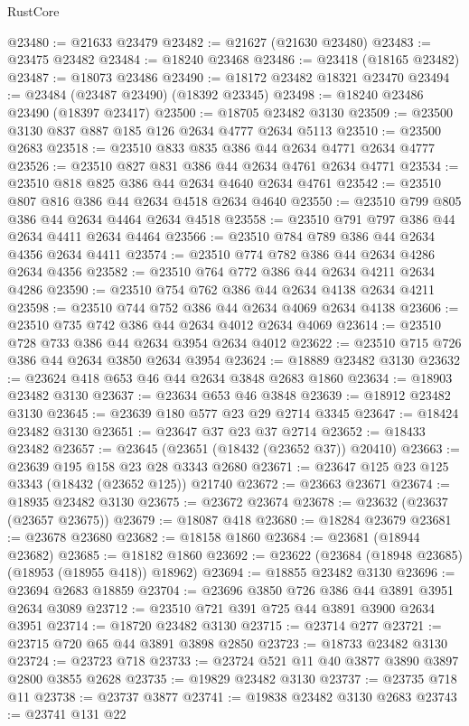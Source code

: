 \begin{lexlean}{RustCore}
\begin{coremodule}
@23480 := @21633 @23479
@23482 := @21627 (@21630 @23480)
@23483 := @23475 @23482
@23484 := @18240 @23468
@23486 := @23418 (@18165 @23482)
@23487 := @18073 @23486
@23490 := @18172 @23482 @18321 @23470
@23494 := @23484 (@23487 @23490) (@18392 @23345)
@23498 := @18240 @23486 @23490 (@18397 @23417)
@23500 := @18705 @23482 @3130
@23509 := @23500 @3130 @837 @887 @185 @126 @2634 @4777 @2634 @5113
@23510 := @23500 @2683
@23518 := @23510 @833 @835 @386 @44 @2634 @4771 @2634 @4777
@23526 := @23510 @827 @831 @386 @44 @2634 @4761 @2634 @4771
@23534 := @23510 @818 @825 @386 @44 @2634 @4640 @2634 @4761
@23542 := @23510 @807 @816 @386 @44 @2634 @4518 @2634 @4640
@23550 := @23510 @799 @805 @386 @44 @2634 @4464 @2634 @4518
@23558 := @23510 @791 @797 @386 @44 @2634 @4411 @2634 @4464
@23566 := @23510 @784 @789 @386 @44 @2634 @4356 @2634 @4411
@23574 := @23510 @774 @782 @386 @44 @2634 @4286 @2634 @4356
@23582 := @23510 @764 @772 @386 @44 @2634 @4211 @2634 @4286
@23590 := @23510 @754 @762 @386 @44 @2634 @4138 @2634 @4211
@23598 := @23510 @744 @752 @386 @44 @2634 @4069 @2634 @4138
@23606 := @23510 @735 @742 @386 @44 @2634 @4012 @2634 @4069
@23614 := @23510 @728 @733 @386 @44 @2634 @3954 @2634 @4012
@23622 := @23510 @715 @726 @386 @44 @2634 @3850 @2634 @3954
@23624 := @18889 @23482 @3130
@23632 := @23624 @418 @653 @46 @44 @2634 @3848 @2683 @1860
@23634 := @18903 @23482 @3130
@23637 := @23634 @653 @46 @3848
@23639 := @18912 @23482 @3130
@23645 := @23639 @180 @577 @23 @29 @2714 @3345
@23647 := @18424 @23482 @3130
@23651 := @23647 @37 @23 @37 @2714
@23652 := @18433 @23482
@23657 := @23645 (@23651 (@18432 (@23652 @37)) @20410)
@23663 := @23639 @195 @158 @23 @28 @3343 @2680
@23671 := @23647 @125 @23 @125 @3343 (@18432 (@23652 @125)) @21740
@23672 := @23663 @23671
@23674 := @18935 @23482 @3130
@23675 := @23672 @23674
@23678 := @23632 (@23637 (@23657 @23675))
@23679 := @18087 @418
@23680 := @18284 @23679
@23681 := @23678 @23680
@23682 := @18158 @1860
@23684 := @23681 (@18944 @23682)
@23685 := @18182 @1860
@23692 := @23622 (@23684 (@18948 @23685) (@18953 (@18955 @418)) @18962)
@23694 := @18855 @23482 @3130
@23696 := @23694 @2683 @18859
@23704 := @23696 @3850 @726 @386 @44 @3891 @3951 @2634 @3089
@23712 := @23510 @721 @391 @725 @44 @3891 @3900 @2634 @3951
@23714 := @18720 @23482 @3130
@23715 := @23714 @277
@23721 := @23715 @720 @65 @44 @3891 @3898 @2850
@23723 := @18733 @23482 @3130
@23724 := @23723 @718
@23733 := @23724 @521 @11 @40 @3877 @3890 @3897 @2800 @3855 @2628
@23735 := @19829 @23482 @3130
@23737 := @23735 @718 @11
@23738 := @23737 @3877
@23741 := @19838 @23482 @3130 @2683
@23743 := @23741 @131 @22

\end{coremodule}
\end{lexlean}
